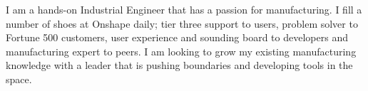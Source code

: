 

\begin{cvparagraph}

I am a hands-on Industrial Engineer that has a passion for manufacturing. I fill a number of shoes at Onshape daily; tier three support to users, problem solver to Fortune 500 customers, user experience and sounding board to developers and manufacturing expert to peers. I am looking to grow my existing manufacturing knowledge with a leader that is pushing boundaries and developing tools in the space.
\end{cvparagraph}
